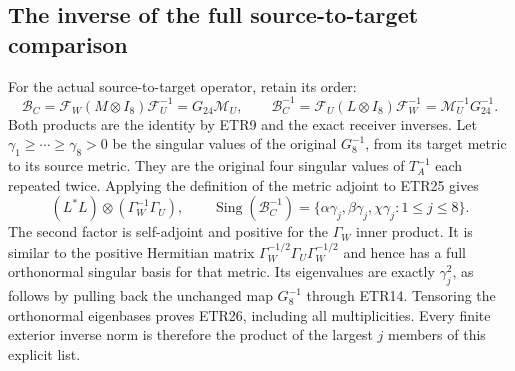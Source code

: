 \documentclass[11pt]{article}
\begin{document}
\subsection{The inverse of the full source-to-target comparison}
For the actual source-to-target operator, retain its order:
\[
 \mathcal B_C=\mathcal F_W(M\otimes I_8)\mathcal F_U^{-1}
              =G_{24}\mathcal M_U,\qquad
 \mathcal B_C^{-1}=\mathcal F_U(L\otimes I_8)\mathcal F_W^{-1}
              =\mathcal M_U^{-1}G_{24}^{-1}.             \tag{ETR25}
\]
Both products are the identity by ETR9 and the exact receiver inverses.
Let $\gamma_1\ge\cdots\ge\gamma_8>0$ be the singular values of the
original $G_8^{-1}$, from its target metric to its source metric. They
are the original four singular values of $T_A^{-1}$ each repeated
twice. Applying the definition of the metric adjoint to ETR25 gives
\[
 (L^*L)\otimes(\Gamma_W^{-1}\Gamma_U),\qquad
 \operatorname{Sing}(\mathcal B_C^{-1})
     =\{\alpha\gamma_j,\beta\gamma_j,\chi\gamma_j:1\le j\le8\}.
                                                               \tag{ETR26}
\]
The second factor is self-adjoint and positive for the $\Gamma_W$
inner product. It is similar to the positive Hermitian matrix
$\Gamma_W^{-1/2}\Gamma_U\Gamma_W^{-1/2}$ and hence has a full
orthonormal singular basis for that metric. Its eigenvalues are exactly
$\gamma_j^2$, as follows by pulling back the unchanged map $G_8^{-1}$
through ETR14. Tensoring the orthonormal eigenbases proves ETR26,
including all multiplicities. Every finite exterior inverse norm is
therefore the product of the largest $j$ members of this explicit list.
\end{document}
